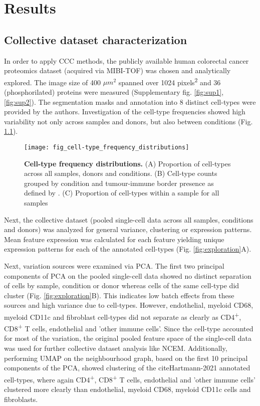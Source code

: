 \chapter{Results}
	
\section{Collective dataset characterization}

In order to apply CCC methods, the publicly available \cite{Hartmann-2021} human colorectal cancer proteomics dataset (acquired via MIBI-TOF) was chosen and analytically explored. The image size of 400 $\mu m^2$ spanned over 1024 pixels\textsuperscript{2} and 36 (phosphorilated) proteins were measured (Supplementary fig. \ref{fig:sup1}, \ref{fig:sup2}). The segmentation masks and annotation into 8 distinct cell-types were provided by the authors. Investigation of the cell-type frequencies showed high variability not only across samples and donors, but also between conditions (Fig. \ref{fig:freq}).
\\[\baselineskip]

\begin{figure}[h!]
    \centering
    \texttt{[image: fig\_cell-type\_frequency\_distributions]}
    \caption{\textbf{Cell-type frequency distributions.} (A) Proportion of cell-types across all samples, donors and conditions. (B) Cell-type counts grouped by condition and tumour-immune border presence as defined by \cite{Hartmann-2021}. (C) Proportion of cell-types within a sample for all samples}
    \label{fig:freq}
\end{figure}


Next, the collective dataset (pooled single-cell data across all samples, conditions and donors) was analyzed for general variance, clustering or expression patterns. Mean feature expression was calculated for each feature yielding unique expression patterns for each of the annotated cell-types (Fig. \ref{fig:exploration}A).

Next, variation sources were examined via PCA. The first two principal components of PCA on the pooled single-cell data showed no distinct separation of cells by sample, condition or donor whereas cells of the same cell-type did cluster (Fig. \ref{fig:exploration}B). This indicates low batch effects from these sources and high variance due to cell-types. However, endothelial, myeloid CD68, myeloid CD11c and fibroblast cell-types did not separate as clearly as CD4\textsuperscript{+}, CD8\textsuperscript{+} T cells, endothelial and 'other immune cells'. Since the cell-type accounted for most of the variation, the original pooled feature space of the single-cell data was used for further collective dataset analysis like NCEM. Additionally, performing UMAP on the neighbourhood graph, based on the first 10 principal components of the PCA, showed clustering of the cite{Hartmann-2021} annotated cell-types, where again CD4\textsuperscript{+}, CD8\textsuperscript{+} T cells, endothelial and 'other immune cells' clustered more clearly than endothelial, myeloid CD68, myeloid CD11c cells and fibroblasts.

